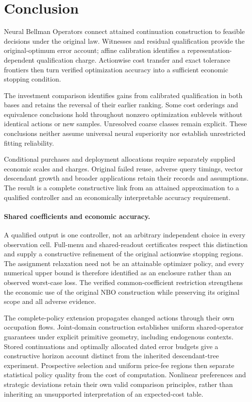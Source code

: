 \documentclass[ecta,nameyear,draft]{econsocart}
\begin{document}
\section{Conclusion}\label{sec:conclusion65}
Neural Bellman Operators connect attained continuation construction to feasible decisions under the original law. Witnesses and residual qualification provide the original-optimum error account; affine calibration identifies a representation-dependent qualification charge. Actionwise cost transfer and exact tolerance frontiers then turn verified optimization accuracy into a sufficient economic stopping condition.

The investment comparison identifies gains from calibrated qualification in both bases and retains the reversal of their earlier ranking. Some cost orderings and equivalence conclusions hold throughout nonzero optimization sublevels without identical actions or new samples. Unresolved coarse classes remain explicit. These conclusions neither assume universal neural superiority nor establish unrestricted fitting reliability.

Conditional purchases and deployment allocations require separately supplied economic scales and charges. Original failed reuse, adverse query timings, vector descendant growth and broader applications retain their records and assumptions. The result is a complete constructive link from an attained approximation to a qualified controller and an economically interpretable accuracy requirement.

\paragraph{Shared coefficients and economic accuracy.}
A qualified output is one controller, not an arbitrary independent choice in every observation cell. Full-menu and shared-readout certificates respect this distinction and supply a constructive refinement of the original actionwise stopping regions. The assignment relaxation need not be an attainable optimizer policy, and every numerical upper bound is therefore identified as an enclosure rather than an observed worst-case loss. The verified common-coefficient restriction strengthens the economic use of the original NBO construction while preserving its original scope and all adverse evidence.

The complete-policy extension propagates changed actions through their own occupation flows. Joint-domain construction establishes uniform shared-operator guarantees under explicit primitive geometry, including endogenous contexts. Stored continuations and optimally allocated dated error budgets give a constructive horizon account distinct from the inherited descendant-tree experiment. Prospective selection and uniform price-fee regions then separate statistical policy quality from the cost of computation. Nonlinear preferences and strategic deviations retain their own valid comparison principles, rather than inheriting an unsupported interpretation of an expected-cost table.
\end{document}
